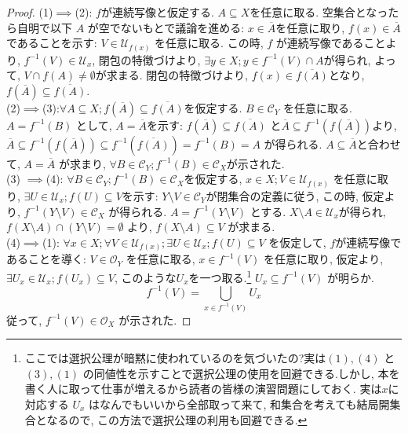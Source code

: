 \documentclass[lualatex]{ltjsbook}
\newcommand{\cl}[1]{\overline{ #1}  }
\theoremstyle{remark}
\theoremstyle{plain}
\begin{document}
\begin{proof}
	(1)$\implies$(2): $f$が連続写像と仮定する. $A \subseteq X$を任意に取る. 空集合となったら自明で以下 $A$ が空でないもとで議論を進める:
$x \in \cl{A}$を任意に取り,   $f(x) \in \cl{A}$であることを示す:
 $V \in \mathcal{U}_{f(x)}$ を任意に取る. 
 この時,  $f$ が連続写像であることより,  
 $f^{-1}\left( V \right) \in \mathcal{U}_x$,  
 閉包の特徴づけより,  
 $\exists y \in X; y \in f^{-1}\left( V \right)\cap A$が得られ,  
 よって,  $V \cap f(A) \neq \emptyset $が求まる. 
 閉包の特徴づけより,  
 $f(x) \in \cl{f(A)}$となり,  $f\left( \cl{A} \right) \subseteq \cl{f\left( A \right) }$.\\
 	(2)$\implies$(3):$\forall A \subseteq X ; f\left( \cl{A} \right) \subseteq \cl{f\left( A \right) }$を仮定する. 
	$B \in \mathcal{C}_Y$ を任意に取る. 
	$A = f^{-1} \left( B \right) $ として,  
	$A = \cl{A}$を示す:
	 $ f\left( \cl{A} \right) \subseteq \cl{f\left( A \right) }  $ と$\cl{A} \subseteq f^{-1}\left( f(\cl{A}) \right)  $より, 
	 $\cl{A} \subseteq f^{-1}\left( f(\cl{A}) \right) \subseteq f^{-1}\left( \cl{f\left( A \right) } \right)  = f ^{-1} \left( B \right) = A$ が得られる. 
	 $A \subseteq \cl{A}$と合わせて,  $A = \cl{A}$ が求まり, 
	 $\forall B \in \mathcal{C}_Y ; f^{-1}\left( B \right)  \in \mathcal{C}_X$が示された.\\
	 (3) $\implies$(4): $\forall B \in \mathcal{C}_Y; f^{-1}\left( B \right)  \in \mathcal{C}_X$を仮定する,  
	 $x \in X ; V \in \mathcal{U}_{f\left( x \right) }$ を任意に取り,  $\exists U \in \mathcal{U}_x ; f\left( U \right) \subseteq V$を示す:
	 $Y \setminus V \in \mathcal{C}_Y$が閉集合の定義に従う,  
	 この時,  仮定より,  $f^{-1}\left( Y\setminus V \right) \in \mathcal{C}_X$ が得られる. 
	 $A = f^{-1} \left( Y \setminus V \right) $ とする. 
	 $X\setminus A \in \mathcal{U}_x $が得られ,  
	 $f\left( X \setminus A \right) \cap \left( Y \setminus V \right) = \emptyset $ より,  
	 $f\left( X \setminus A \right) \subseteq V$ が求まる. \\
	(4)$\implies$(1): $\forall x \in X; \forall V \in \mathcal{U}_{f(x)};\exists U \in \mathcal{U}_x; f(U) \subseteq V $ を仮定して,  $f$が連続写像であることを導く:
	 $V \in \mathcal{O}_Y$ を任意に取る,  $x \in f^{-1}\left( V \right) $ を任意に取り,  
 仮定より, $\exists U_x \in \mathcal{U}_x ; f(U_x) \subseteq V$,  このような$U_x$を一つ取る.\footnote{ここでは選択公理が暗黙に使われているのを気づいたの?実は$(1), (4)$ と $(3), (1)$ の同値性を示すことで選択公理の使用を回避できる.しかし, 本を書く人に取って仕事が増えるから読者の皆様の演習問題にしておく. 実は$x$に対応する $U_x$ はなんでもいいから全部取って来て,  和集合を考えても結局開集合となるので,  この方法で選択公理の利用も回避できる.} $U_x \subseteq f^{-1}\left( V \right) $ が明らか. 
	 $$
	 f^{-1}\left( V \right) = \bigcup_{x \in f^{-1}\left( V \right) } U_x
	 $$
	 従って,  $f^{-1} \left( V \right) \in \mathcal{O}_X$ が示された.
\end{proof}
\end{document}
